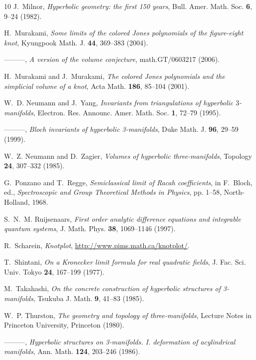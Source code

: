 \documentclass[12pt,reqno]{amsart}
\numberwithin{equation}{section}
\begin{document}
\begin{thebibliography}{10}
J.~Milnor, \emph{Hyperbolic geometry: the first 150 years}, Bull. Amer. Math.
  Soc. \textbf{6}, 9--24 (1982).

H.~Murakami, \emph{Some limits of the colored {Jones} polynomials of the
  figure-eight knot}, Kyungpook Math. J. \textbf{44}, 369--383 (2004).

---{}---{}---, \emph{A version of the volume conjecture}, math.GT/0603217
  (2006).

H.~Murakami and J.~Murakami, \emph{The colored {Jones} polynomials and the
  simplicial volume of a knot}, Acta Math. \textbf{186}, 85--104 (2001).

W.~D. Neumann and J.~Yang, \emph{Invariants from triangulations of hyperbolic
  $3$-manifolds}, Electron. Res. Announc. Amer. Math. Soc. \textbf{1}, 72--79
  (1995).

---{}---{}---, \emph{Bloch invariants of hyperbolic 3-manifolds}, Duke Math. J.
  \textbf{96}, 29--59 (1999).

W.~Z. Neumann and D.~Zagier, \emph{Volumes of hyperbolic three-manifolds},
  Topology \textbf{24}, 307--332 (1985).

G.~Ponzano and T.~Regge, \emph{Semiclassical limit of {Racah} coefficients}, in
  F.~Bloch, ed., \emph{Spectroscopic and Group Theoretical Methods in Physics},
  pp. 1--58, North-Holland, 1968.

S.~N.~M. Ruijsenaars, \emph{First order analytic difference equations and
  integrable quantum systems}, J. Math. Phys. \textbf{38}, 1069--1146 (1997).

R.~Scharein, \emph{Knotplot}, \url{http://www.pims.math.ca/knotplot/}.

T.~Shintani, \emph{On a {Kronecker} limit formula for real quadratic fields},
  J. Fac. Sci. Univ. Tokyo \textbf{24}, 167--199 (1977).

M.~Takahashi, \emph{On the concrete construction of hyperbolic structures of
  3-manifolds}, Tsukuba J. Math. \textbf{9}, 41--83 (1985).

W.~P. Thurston, \emph{The geometry and topology of three-manifolds}, Lecture
  Notes in Princeton University, Princeton (1980).

---{}---{}---, \emph{Hyperbolic structures on 3-manifolds. {I}. deformation of
  acylindrical manifolds}, Ann. Math. \textbf{124}, 203--246 (1986).


\end{thebibliography}
\end{document}
